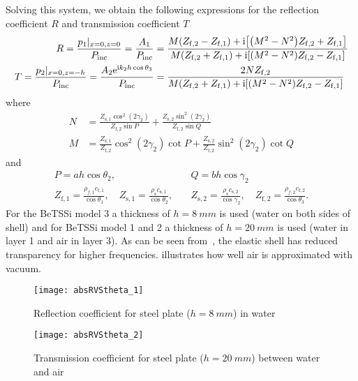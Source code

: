Solving this system, we obtain the following expressions for the reflection coefficient $R$ and transmission coefficient $T$
\begin{align*}
	R =\frac{p_1\vert_{x=0,z=0}}{P_{\mathrm{inc}}} = \frac{A_1}{P_{\mathrm{inc}}} &= \frac{M(Z_{\mathrm{f},2}-Z_{\mathrm{f},1}) + \imag\left[\left(M^2-N^2\right)Z_{\mathrm{f},2}+Z_{\mathrm{f},1}\right]}{M(Z_{\mathrm{f},2}+Z_{\mathrm{f},1}) + \imag\left[\left(M^2-N^2\right)Z_{\mathrm{f},2}-Z_{\mathrm{f},1}\right]}\\
	T = \frac{p_2\vert_{x=0,z=-h}}{P_{\mathrm{inc}}} = \frac{A_2\euler^{\imag k_2 h \cos\theta_3}}{P_{\mathrm{inc}}} &= \frac{2NZ_{\mathrm{f},2}}{M(Z_{\mathrm{f},2}+Z_{\mathrm{f},1}) + \imag\left[\left(M^2-N^2\right)Z_{\mathrm{f},2}-Z_{\mathrm{f},1}\right]}
\end{align*}
where
\begin{align*}
	N &= \frac{Z_{\mathrm{s},1}\cos^2(2\gamma_2)}{Z_{\mathrm{f},2}\sin P} + \frac{Z_{\mathrm{s},2}\sin^2(2\gamma_2)}{Z_{\mathrm{f},2}\sin Q}\\
	M &= \frac{Z_{\mathrm{s},1}}{Z_{\mathrm{f},2}}\cos^2(2\gamma_2)\cot P + \frac{Z_{\mathrm{s},2}}{Z_{\mathrm{f},2}}\sin^2(2\gamma_2)\cot Q
\end{align*}
and
\begin{align*}
	P = a h\cos\theta_2,&\quad Q = b h\cos\gamma_2\\
	Z_{\mathrm{f},1} = \frac{\rho_{f,1} c_{\mathrm{f},1}}{\cos\theta_1},\quad Z_{\mathrm{s},1} = \frac{\rho_{\mathrm{s}} c_{\mathrm{s},1}}{\cos\theta_2},&\quad Z_{\mathrm{s},2} = \frac{\rho_{\mathrm{s}} c_{\mathrm{s},2}}{\cos\gamma_2},\quad  Z_{\mathrm{f},2} = \frac{\rho_{f,2} c_{\mathrm{f},2}}{\cos\theta_3}.
\end{align*}
For the BeTSSi model 3 a thickness of $h=\SI{8}{mm}$ is used (water on both sides of shell) and for BeTSSi model 1 and 2 a thickness of $h=\SI{20}{mm}$ is used (water in layer 1 and air in layer 3). As can be seen from~, the elastic shell has reduced transparency for higher frequencies.  illustrates how well air is approximated with vacuum.
\begin{figure}
	\centering
	\texttt{[image: absRVStheta\_1]}
	\caption{Reflection coefficient for steel plate ($h=\SI{8}{mm}$) in water}
	\label{Fig:absRVStheta_1}
\end{figure}
\begin{figure}
	\centering
	\texttt{[image: absRVStheta\_2]}
	\caption{Transmission coefficient for steel plate ($h=\SI{20}{mm}$) between water and air}
	\label{Fig:absRVStheta_2}
\end{figure}
